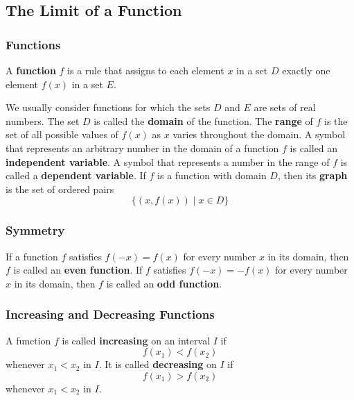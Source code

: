 \subsection{The Limit of a Function}

\subsubsection*{Functions}
\begin{definition}
    A \textbf{function} \(f\) is a rule that assigns to each element \(x\) in
    a set \(D\) exactly one element \(f(x)\) in a set \(E\).
\end{definition}
We usually consider functions for which the sets \(D\) and \(E\) are sets of
real numbers.
The set \(D\) is called the \textbf{domain} of the function.
The \textbf{range} of \(f\) is the set of all possible values of \(f(x)\) as
\(x\) varies throughout the domain.
A symbol that represents an arbitrary number in the domain of a function \(f\)
is called an \textbf{independent variable}.
A symbol that represents a number in the range of \(f\) is called a
\textbf{dependent variable}.
If \(f\) is a function with domain \(D\), then its \textbf{graph} is the set
of ordered pairs
\[\{(x,f(x))\mid x\in D\}\]

\subsubsection*{Symmetry}
If a function \(f\) satisfies \(f(-x)=f(x)\) for every number \(x\) in its
domain, then \(f\) is called an \textbf{even function}.
If \(f\) satisfies \(f(-x)=-f(x)\) for every number \(x\) in its
domain, then \(f\) is called an \textbf{odd function}.

\subsubsection*{Increasing and Decreasing Functions}
A function \(f\) is called \textbf{increasing} on an interval \(I\) if
\[f(x_1)<f(x_2)\]
whenever \(x_1<x_2\) in \(I\).
It is called \textbf{decreasing} on \(I\) if
\[f(x_1)>f(x_2)\]
whenever \(x_1<x_2\) in \(I\).

